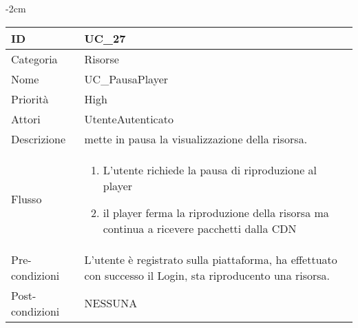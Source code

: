 \begin{center}
\begin{table}[bp]
    \centering
    \addtolength{\leftskip} {-2cm}
\begin{tabular}{ |p{2.6cm}|p{13cm}|  }
\hline
ID & UC\_27 \\\hline
Categoria & Risorse\\\hline
Nome & UC\_PausaPlayer\\\hline
Priorità & High \\\hline
Attori &  UtenteAutenticato \\\hline
Descrizione & mette in pausa la visualizzazione della risorsa.\\\hline
Flusso &  	\begin{enumerate}
			\item L'utente richiede la pausa di riproduzione al player
			\item il player ferma la riproduzione della risorsa ma continua a ricevere pacchetti dalla CDN 
			\end{enumerate}
			\\\hline
Pre-condizioni & L'utente è registrato sulla piattaforma, ha effettuato con successo il Login, sta riproducento una risorsa.\\\hline
Post-condizioni & NESSUNA\\\hline
\end{tabular}
\label{table_use_case:27}\newline
\end{table}


\end{center}
